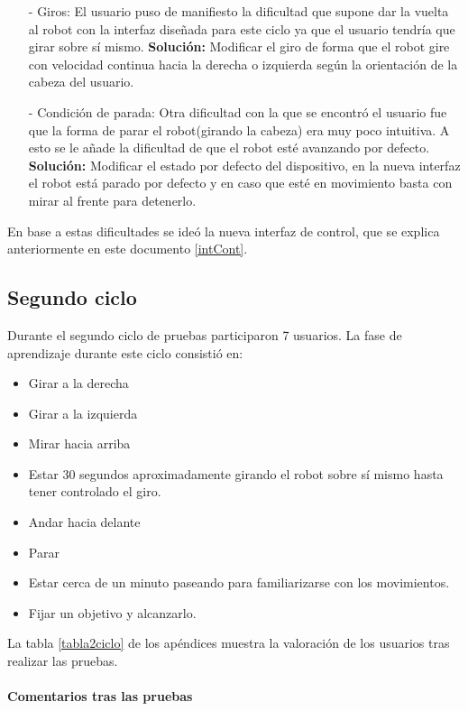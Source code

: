 \documentclass[twoside, 11pt]{epstfg}
\begin{document}
\begin{itemize}
	\item [ - ] Giros: El usuario puso de manifiesto la dificultad que supone dar la vuelta al robot con la interfaz diseñada para este ciclo ya que el usuario tendría que girar sobre sí mismo.
	\subitem \textbf{Solución:} Modificar el giro de forma que el robot gire con velocidad continua hacia la derecha o izquierda según la orientación de la cabeza del usuario. 
	\item [ - ] Condición de parada: Otra dificultad con la que se encontró el usuario fue que la forma de parar el robot(girando la cabeza) era muy poco intuitiva.  A esto se le añade la dificultad de que el robot esté avanzando por defecto.
	\subitem \textbf{Solución:} Modificar el estado por defecto del dispositivo, en la nueva interfaz el robot está parado por defecto y en caso que esté en movimiento basta con mirar al frente para detenerlo.
\end{itemize}

En base a estas dificultades se ideó la nueva interfaz de control, que se explica anteriormente en este documento \ref{intCont}.

\subsection{Segundo ciclo}

Durante el segundo ciclo de pruebas participaron 7 usuarios.
La fase de aprendizaje durante este ciclo consistió en:

\begin{itemize}
	\item Girar a la derecha
	\item Girar a la izquierda
	\item Mirar hacia arriba
	\item Estar 30 segundos aproximadamente girando el robot sobre sí mismo hasta tener controlado el giro.
	\item Andar hacia delante
	\item Parar
	\item Estar cerca de un minuto paseando para familiarizarse con los movimientos.
	\item Fijar un objetivo y alcanzarlo.
\end{itemize}

La tabla \ref{tabla2ciclo} de los apéndices muestra la valoración de los usuarios tras realizar las pruebas.


\paragraph{Comentarios tras las pruebas}
\end{document}
